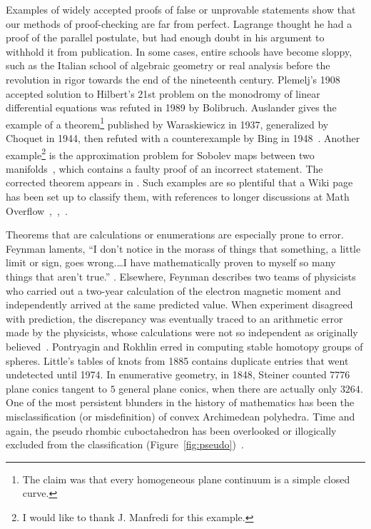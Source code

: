 \documentclass{llncs}
\begin{document}
Examples of widely accepted proofs of false or unprovable statements
show that our methods of proof-checking are far from perfect.
Lagrange thought he had a proof of the parallel postulate, but had
enough doubt in his argument to withhold it from publication.  In some
cases, entire schools have become sloppy, such as the Italian school
of algebraic geometry or real analysis before the revolution in rigor
towards the end of the nineteenth century.  Plemelj's 1908 accepted
solution to Hilbert's 21st problem on the monodromy of linear
differential equations was refuted in 1989 by Bolibruch.  Auslander
gives the example of a theorem\footnote{The claim was that every
  homogeneous plane continuum is a simple closed curve.}  published by
Waraskiewicz in 1937, generalized by Choquet in 1944, then refuted
with a counterexample by Bing in 1948~\cite{Aus}.  Another
example\footnote{I would like to thank J. Manfredi for this example.}
is the approximation problem for Sobolev maps between two
manifolds~\cite{Bethuel}, which contains a faulty proof of an
incorrect statement.  The corrected theorem appears in \cite{Hang}.
Such examples are so plentiful that a Wiki page has been set up to
classify them, with references to longer discussions at Math
Overflow~\cite{WikiPIP},~\cite{Over2},~\cite{Over1}.


Theorems that are calculations or enumerations are especially prone to
error.  Feynman laments, ``I don't notice in the morass of things that something, a
little limit or sign, goes wrong.\dots I have mathematically proven to myself
so many things that aren't true.''
\cite[p.~885]{FeCo}. Elsewhere, Feynman describes two teams of
physicists who carried out a two-year calculation of the electron
magnetic moment and independently arrived at the same predicted value.
When experiment disagreed with prediction, the discrepancy was
eventually traced to an arithmetic error made by the physicists, whose
calculations were not so independent as originally
believed~\cite[p.~117]{FQED}.  Pontryagin and Rokhlin erred in
computing stable homotopy groups of spheres.  Little's tables of knots
from 1885 contains duplicate entries that went undetected until 1974.
In enumerative geometry, in 1848, Steiner counted $7776$ plane conics
tangent to $5$ general plane conics, when there are actually only
$3264$.  One of the most persistent blunders in the history of
mathematics has been the misclassification (or misdefinition) of
convex Archimedean polyhedra.  Time and again, the pseudo rhombic
cuboctahedron has been overlooked or illogically excluded from the
classification (Figure~\ref{fig:pseudo})~\cite{Gr11}.
\end{document}
